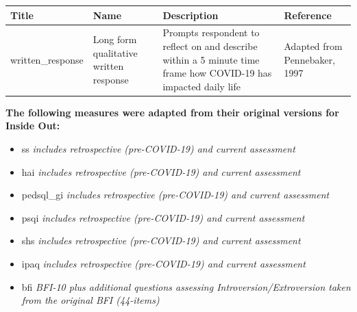 \documentclass[]{book}
\providecommand{\tightlist}{%
  \setlength{\itemsep}{0pt}\setlength{\parskip}{0pt}}
\begin{document}
\begin{longtable}[]{@{}llll@{}}
\toprule
\begin{minipage}[b]{0.22\columnwidth}\raggedright
Title\strut
\end{minipage} & \begin{minipage}[b]{0.27\columnwidth}\raggedright
Name\strut
\end{minipage} & \begin{minipage}[b]{0.22\columnwidth}\raggedright
Description\strut
\end{minipage} & \begin{minipage}[b]{0.18\columnwidth}\raggedright
Reference\strut
\end{minipage}\tabularnewline
\midrule
\endhead
\begin{minipage}[t]{0.22\columnwidth}\raggedright
written\_response\strut
\end{minipage} & \begin{minipage}[t]{0.27\columnwidth}\raggedright
Long form qualitative written response\strut
\end{minipage} & \begin{minipage}[t]{0.22\columnwidth}\raggedright
Prompts respondent to reflect on and describe within a 5 minute time frame how COVID-19 has impacted daily life\strut
\end{minipage} & \begin{minipage}[t]{0.18\columnwidth}\raggedright
Adapted from Pennebaker, 1997\strut
\end{minipage}\tabularnewline
\bottomrule
\end{longtable}

\textbf{The following measures were adapted from their original versions for Inside Out:}

\begin{itemize}
\tightlist
\item
  ss
  \emph{includes retrospective (pre-COVID-19) and current assessment}
\item
  hai
  \emph{includes retrospective (pre-COVID-19) and current assessment}
\item
  pedsql\_gi
  \emph{includes retrospective (pre-COVID-19) and current assessment}
\item
  psqi
  \emph{includes retrospective (pre-COVID-19) and current assessment}
\item
  shs
  \emph{includes retrospective (pre-COVID-19) and current assessment}
\item
  ipaq
  \emph{includes retrospective (pre-COVID-19) and current assessment}
\item
  bfi
  \emph{BFI-10 plus additional questions assessing Introversion/Extroversion taken from the original BFI (44-items)}
\end{itemize}
\end{document}
